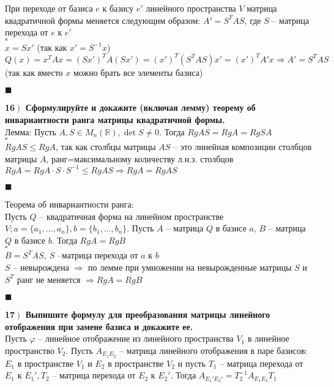 \documentclass[a4paper,12pt]{article}
\begin{document}
При переходе от базиса $e$ к базису $e'$ линейного пространства $V$ матрица квадратичной формы меняется следующим образом: $A'=S^TAS$, где $S$ -- матрица перехода от $e$ к $e'$\\
$\square$\\
$x=Sx'$ (так как $x'=S^{-1}x$)\\
$Q(x)=x^TAx=(Sx')^TA(Sx')=(x')^T(S^TAS)x'=(x')^TA'x\Rightarrow A'=S^TAS$ (так как вместо $x$ можно брать все элементы базиса)
\begin{flushright}
	$\blacksquare$
\end{flushright}
\textbf{16$\left.\right)$ Сформулируйте и докажите (включая лемму) теорему об инвариантности ранга матрицы квадратичной формы.}\\Лемма: Пусть $A, S\in M_n(\mathbb{R}), \det S\ne 0$. Тогда $RgAS=RgA=RgSA$\\
$\square$\\
$RgAS\leq RgA$, так как столбцы матрицы $AS$ -- это линейная композиции столбцов матрицы $A$,  ранг=максимальному количеству л.н.з. столбцов \\$RgA=RgA\cdot S\cdot S^{-1}\leq RgAS\Rightarrow RgA=RgAS$
\begin{flushright}
	$\blacksquare$
\end{flushright}
Теорема об инвариантности ранга:\\
Пусть $Q$ -- квадратичная форма на линейном пространстве $V; a=\{a_1, \ldots, a_n \}, b=\{b_1, \ldots, b_n \}$. Пусть $A$ -- матрица $Q$ в базисе $a$, $B$ -- матрица $Q$ в базисе $b$. Тогда $RgA=RgB$\\
$\square$\\
$B=S^TAS,\ S$ --матрица перехода от $a$ к $b$\\
$S$ -- невырождена $\Rightarrow$ по лемме при умножении на невырожденные матрицы $S$ и $S^T$ ранг не меняется $\Rightarrow RgA=RgB$
\begin{flushright}
	$\blacksquare$
\end{flushright}
\textbf{17$\left.\right)$ Выпишите формулу для преобразования матрицы линейного отображения при замене базиса и докажите ее.}\\Пусть $\varphi$ -- линейное отображение из линейного пространства $V_1$ в линейное пространство $V_2$. Пусть $A_{E_1E_2}$ -- матрица линейного отображения в паре базисов: $E_1$ в пространстве $V_1$ и $E_2$ в пространстве $V_2$ и пусть $T_1$ -- матрица перехода от $E_1$ к $E_1', T_2$ -- матрица перехода от $E_2$ к $E_2'$. Тогда $A_{E_1'E_2'}=T_2^{-1}A_{E_1E_2}T_1$\\
\end{document}
